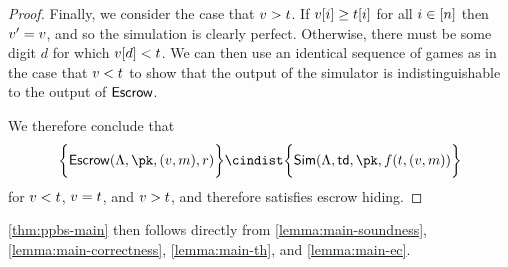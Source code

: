\begin{proof}
	Finally, we consider the case that $v > t$.
	If $v[i] \geq t[i]$ for all $i \in [n]$ then $v' = v$, and so the simulation is clearly perfect.
	Otherwise, there must be some digit $d$ for which $v[d] < t$.
	We can then use an identical sequence of games as in the case that $v < t$ to show that the output of the simulator is indistinguishable to the output of ${\sf Escrow}$.

	We therefore conclude that $$\bigg\{ \escrow(\ppbpp, \pk, (\uval, \msg), r) \bigg\} \cindist \bigg\{\Sim(\ppbpp, \td, \pk, f(\thr, (\uval, \msg)) \bigg\}$$ for $v < t$, $v = t$, and $v > t$, and therefore \schemename{} satisfies escrow hiding.
\end{proof}

\cref{thm:ppbs-main} then follows directly from \cref{lemma:main-soundness}, \cref{lemma:main-correctness}, \cref{lemma:main-th}, and \cref{lemma:main-ec}.
